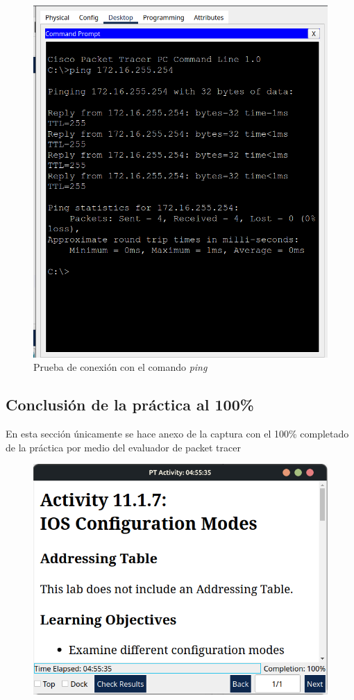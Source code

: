 \documentclass[a4paper,11pt]{article}
\begin{document}
\begin{figure}[H]
    \includegraphics[width=1\textwidth]{images/ping.png}
    \caption{Prueba de conexión con el comando \emph{ping}}
\end{figure}

\subsection{Conclusión de la práctica al 100\%}
En esta sección únicamente se hace anexo de la captura con el 100\% completado
de la práctica por medio del evaluador de packet tracer

\begin{figure}[H]
    \includegraphics[width=1\textwidth]{images/completion.png}
\end{figure}
\end{document}

